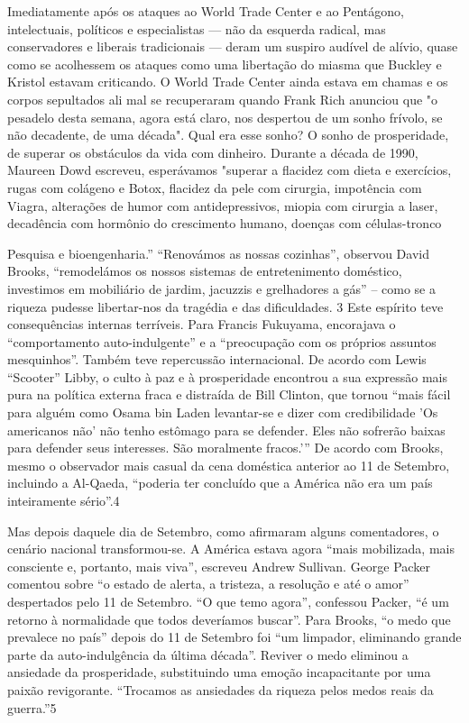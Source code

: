 Imediatamente após os ataques ao World Trade Center e ao Pentágono, intelectuais, políticos e especialistas — não da esquerda radical, mas conservadores e liberais tradicionais — deram um suspiro audível de alívio, quase como se acolhessem os ataques como uma libertação do miasma que Buckley e Kristol estavam criticando. O World Trade Center ainda estava em chamas e os corpos sepultados ali mal se recuperaram quando Frank Rich anunciou que "o pesadelo desta semana, agora está claro, nos despertou de um sonho frívolo, se não decadente, de uma década". Qual era esse sonho? O sonho de prosperidade, de superar os obstáculos da vida com dinheiro. Durante a década de 1990, Maureen Dowd escreveu, esperávamos "superar a flacidez com dieta e exercícios, rugas com colágeno e Botox, flacidez da pele com cirurgia, impotência com Viagra, alterações de humor com antidepressivos, miopia com cirurgia a laser, decadência com hormônio do crescimento humano, doenças com células-tronco
 \par 
Pesquisa e bioengenharia.” “Renovámos as nossas cozinhas”, observou David Brooks, “remodelámos os nossos sistemas de entretenimento doméstico, investimos em mobiliário de jardim, jacuzzis e grelhadores a gás” – como se a riqueza pudesse libertar-nos da tragédia e das dificuldades. {\color{blue}3} Este espírito teve consequências internas terríveis. Para Francis Fukuyama, encorajava o “comportamento auto-indulgente” e a “preocupação com os próprios assuntos mesquinhos”. Também teve repercussão internacional. De acordo com Lewis “Scooter” Libby, o culto à paz e à prosperidade encontrou a sua expressão mais pura na política externa fraca e distraída de Bill Clinton, que tornou “mais fácil para alguém como Osama bin Laden levantar-se e dizer com credibilidade 'Os americanos não' não tenho estômago para se defender. Eles não sofrerão baixas para defender seus interesses. São moralmente fracos.’” De ​​acordo com Brooks, mesmo o observador mais casual da cena doméstica anterior ao {\color{blue}11} de Setembro, incluindo a Al-Qaeda, “poderia ter concluído que a América não era um país inteiramente sério”.{\color{blue}4}
 \par 
Mas depois daquele dia de Setembro, como afirmaram alguns comentadores, o cenário nacional transformou-se. A América estava agora “mais mobilizada, mais consciente e, portanto, mais viva”, escreveu Andrew Sullivan. George Packer comentou sobre “o estado de alerta, a tristeza, a resolução e até o amor” despertados pelo {\color{blue}11} de Setembro. “O que temo agora”, confessou Packer, “é um retorno à normalidade que todos deveríamos buscar”. Para Brooks, “o medo que prevalece no país” depois do {\color{blue}11} de Setembro foi “um limpador, eliminando grande parte da auto-indulgência da última década”. Reviver o medo eliminou a ansiedade da prosperidade, substituindo uma emoção incapacitante por uma paixão revigorante. “Trocamos as ansiedades da riqueza pelos medos reais da guerra.”{\color{blue}5}
